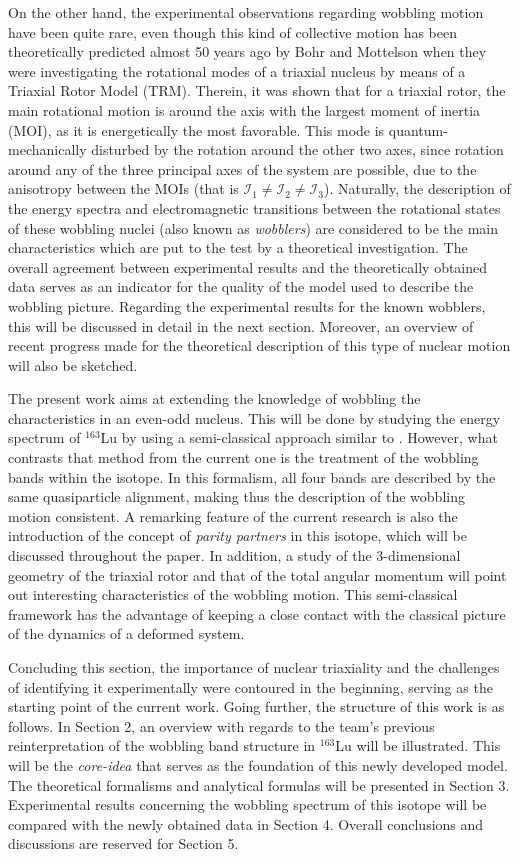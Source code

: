 \documentclass[11pt]{article}
\begin{document}
On the other hand, the experimental observations regarding wobbling motion have been quite rare, even though this kind of collective motion has been theoretically predicted almost 50 years ago by Bohr and Mottelson \cite{bohr1998nuclear} when they were investigating the rotational modes of a triaxial nucleus by means of a Triaxial Rotor Model (TRM). Therein, it was shown that for a triaxial rotor, the main rotational motion is around the axis with the largest moment of inertia (MOI), as it is energetically the most favorable. This mode is quantum-mechanically disturbed by the rotation around the other two axes, since rotation around any of the three principal axes of the system are possible, due to the anisotropy between the MOIs (that is $\mathcal{I}_1\neq\mathcal{I}_2\neq\mathcal{I}_3$). Naturally, the description of the energy spectra and electromagnetic transitions between the rotational states of these wobbling nuclei (also known as \emph{wobblers}) are considered to be the main characteristics which are put to the test by a theoretical investigation. The overall agreement between experimental results and the theoretically obtained data serves as an indicator for the quality of the model used to describe the wobbling picture. Regarding the experimental results for the known wobblers, this will be discussed in detail in the next section. Moreover, an overview of recent progress made for the theoretical description of this type of nuclear motion will also be sketched.

The present work aims at extending the knowledge of wobbling the characteristics in an even-odd nucleus. This will be done by studying the energy spectrum of $^{163}$Lu by using a semi-classical approach similar to \cite{raduta2020towards}. However, what contrasts that method from the current one is the treatment of the wobbling bands within the isotope. In this formalism, all four bands are described by the same quasiparticle alignment, making thus the description of the wobbling motion consistent. A remarking feature of the current research is also the introduction of the concept of \emph{parity partners} in this isotope, which will be discussed throughout the paper. In addition, a study of the 3-dimensional geometry of the triaxial rotor and that of the total angular momentum will point out interesting characteristics of the wobbling motion. This semi-classical framework has the advantage of keeping a close contact with the classical picture of the dynamics of a deformed system.

Concluding this section, the importance of nuclear triaxiality and the challenges of identifying it experimentally were contoured in the beginning, serving as the starting point of the current work. 
Going further, the structure of this  work is as follows. In Section 2, an overview with regards to the team's previous reinterpretation of the wobbling band structure in $^{163}$Lu will be illustrated. This will be the \emph{core-idea} that serves as the foundation of this newly developed model. The theoretical formalisms and analytical formulas will be  presented in Section 3. Experimental results concerning the wobbling spectrum of this isotope will be compared with the newly obtained data in Section 4. Overall conclusions and discussions are reserved for Section 5.
\end{document}
